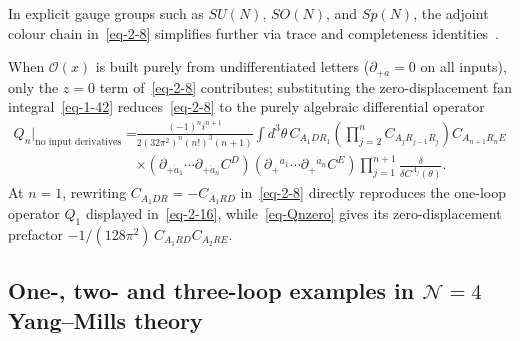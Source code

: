 \documentclass[11pt]{article}
\numberwithin{equation}{section}
\numberwithin{figure}{section}
\numberwithin{table}{section}
\begin{document}
In explicit gauge groups such as $SU(N)$, $SO(N)$, and $Sp(N)$, the adjoint colour chain in~\eqref{eq-2-8} simplifies further via trace and completeness identities~\cite{Repo}.

When $\mathcal O(x)$ is built purely from undifferentiated letters ($\partial_{+\dot a}=0$ on all inputs), only the $z=0$ term of~\eqref{eq-2-8} contributes; substituting the zero-displacement fan integral~\eqref{eq-1-42} reduces~\eqref{eq-2-8} to the purely algebraic differential operator
\begin{equation}\label{eq-Qnzero}
\begin{aligned}
Q_n\big|_{\text{no input derivatives}}
={}&\frac{(-1)^ni^{n+1}}{2(32\pi^2)^n(n!)^3(n+1)}
\int d^3\theta\,
C_{A_1DR_1}\left(\prod_{j=2}^nC_{A_jR_{j-1}R_j}\right)
C_{A_{n+1}R_nE}\\
&\times(\partial_{+\dot a_1}\cdots\partial_{+\dot a_n}C^D)
(\partial_+{}^{\dot a_1}\cdots\partial_+{}^{\dot a_n}C^E)
\prod_{j=1}^{n+1}\frac{\delta}{\delta C^{A_j}(\theta)}.
\end{aligned}
\end{equation}
At $n=1$, rewriting $C_{A_1DR}=-C_{A_1RD}$ in~\eqref{eq-2-8} directly reproduces the one-loop operator $Q_1$ displayed in~\eqref{eq-2-16}, while~\eqref{eq-Qnzero} gives its zero-displacement prefactor $-1/(128\pi^2)\,C_{A_1RD}C_{A_2RE}$.

\subsection{One-, two- and three-loop examples in \texorpdfstring{$\mathcal N=4$}{N=4} Yang--Mills theory}\label{examples-in-mathcal-n4-yangmills-theory}
\end{document}
